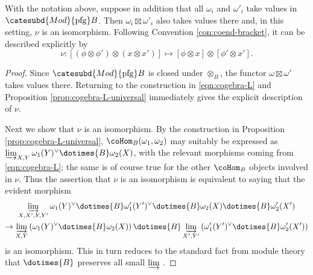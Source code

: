 \begin{lemma}
	With the notation above, suppose in addition that all $\omega_i$ and $\omega'_i$ take values in $\catesubd{Mod}{\mathrm{pfg}}B$. Then $\omega_i \boxtimes \omega'_i$ also takes values there and, in this setting, $\nu$ is an isomorphism. Following Convention \ref{con:coend-bracket}, it can be described explicitly by
	\begin{equation*}
		\nu: \left[ (\phi \otimes \phi') \otimes (x \otimes x') \right] \mapsto [\phi \otimes x] \otimes [\phi' \otimes x'].
	\end{equation*}
\end{lemma}
\begin{proof}
	Since $\catesubd{Mod}{\mathrm{pfg}}B$ is closed under $\otimes_B$, the functor $\omega \boxtimes \omega'$ takes values there. Returning to the construction in \eqref{eqn:cogebra-L} and Proposition \ref{prop:cogebra-L-universal} immediately gives the explicit description of $\nu$.
	
	Next we show that $\nu$ is an isomorphism. By the construction in Proposition \ref{prop:cogebra-L-universal}, $\coHom_B(\omega_1, \omega_2)$ may suitably be expressed as $\varinjlim_{X, Y} \omega_1(Y)^\vee \dotimes{B} \omega_2(X)$, with the relevant morphisms coming from \eqref{eqn:cogebra-L}; the same is of course true for the other $\coHom_B$ objects involved in $\nu$. Thus the assertion that $\nu$ is an isomorphism is equivalent to saying that the evident morphism
	\begin{multline*}
		\varinjlim_{X, X', Y, Y'} \omega_1(Y)^\vee \dotimes{B} \omega'_1(Y')^\vee \dotimes{B} \omega_2(X) \dotimes{B} \omega'_2(X') \\
		\to \varinjlim_{X, Y} \left( \omega_1(Y)^\vee \dotimes{B} \omega_2(X) \right) \dotimes{B} \varinjlim_{X', Y'} \left( \omega'_1(Y')^\vee \dotimes{B} \omega'_2(X') \right)
	\end{multline*}
	is an isomorphism. This in turn reduces to the standard fact from module theory that $\dotimes{B}$ preserves all small $\varinjlim$ \cite[Proposition 6.9.2]{Li1}.
\end{proof}

